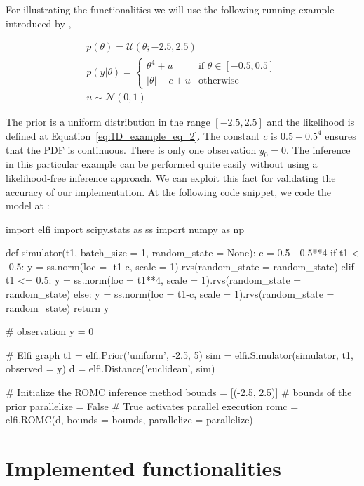 \documentclass[nojss]{jss}
\begin{document}
For illustrating the functionalities we will use the following running
example introduced by \citet{Ikonomov2019},

\begin{gather} \label{eq:1D_example}
  p(\theta) = \mathcal{U}(\theta;-2.5,2.5)\\ \label{eq:1D_example_eq_2}
  p(y|\theta) = \left\{
    \begin{array}{ll} \theta^4 + u & \mbox{if } \theta \in [-0.5, 0.5]
\\ |\theta| - c + u & \mbox{otherwise}
    \end{array} \right.\\
  u \sim \mathcal{N}(0,1)
\end{gather}

\noindent

The prior is a uniform distribution in the range \([-2.5, 2.5]\) and
the likelihood is defined at Equation~\ref{eq:1D_example_eq_2}. The
constant \(c\) is \(0.5 - 0.5^4\) ensures that the PDF is
continuous. There is only one observation \(y_0 = 0\). The inference
in this particular example can be performed quite easily without using
a likelihood-free inference approach. We can exploit this fact for
validating the accuracy of our implementation. At the following code
snippet, we code the model at :

\begin{Code}
import elfi
import scipy.stats as ss
import numpy as np

def simulator(t1, batch_size = 1, random_state = None):
    c = 0.5 - 0.5**4
    if t1 < -0.5:
        y = ss.norm(loc = -t1-c, scale = 1).rvs(random_state = random_state)
    elif t1 <= 0.5:
        y = ss.norm(loc = t1**4, scale = 1).rvs(random_state = random_state)
    else:
        y = ss.norm(loc = t1-c, scale = 1).rvs(random_state = random_state)
    return y

# observation
y = 0

# Elfi graph
t1 = elfi.Prior('uniform', -2.5, 5)
sim = elfi.Simulator(simulator, t1, observed = y)
d = elfi.Distance('euclidean', sim)

# Initialize the ROMC inference method
bounds = [(-2.5, 2.5)] # bounds of the prior
parallelize = False # True activates parallel execution
romc = elfi.ROMC(d, bounds = bounds, parallelize = parallelize)
\end{Code}


\section{Implemented functionalities}
\end{document}
